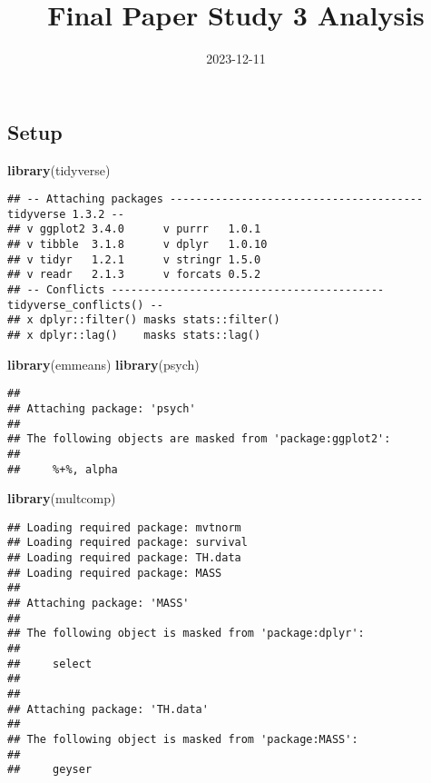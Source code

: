 \documentclass[
]{article}
\title{Final Paper Study 3 Analysis}
\author{}
\date{\vspace{-2.5em}2023-12-11}
\newenvironment{Shaded}{\begin{snugshade}}{\end{snugshade}}
\newcommand{\FunctionTok}[1]{\textcolor[rgb]{0.13,0.29,0.53}{\textbf{#1}}}
\newcommand{\NormalTok}[1]{#1}
\begin{document}
\maketitle

\hypertarget{setup}{%
\subsection{Setup}\label{setup}}

\begin{Shaded}
\begin{Highlighting}[]
\FunctionTok{library}\NormalTok{(tidyverse)}
\end{Highlighting}
\end{Shaded}

\begin{verbatim}
## -- Attaching packages --------------------------------------- tidyverse 1.3.2 --
## v ggplot2 3.4.0      v purrr   1.0.1 
## v tibble  3.1.8      v dplyr   1.0.10
## v tidyr   1.2.1      v stringr 1.5.0 
## v readr   2.1.3      v forcats 0.5.2 
## -- Conflicts ------------------------------------------ tidyverse_conflicts() --
## x dplyr::filter() masks stats::filter()
## x dplyr::lag()    masks stats::lag()
\end{verbatim}

\begin{Shaded}
\begin{Highlighting}[]
\FunctionTok{library}\NormalTok{(emmeans)}
\FunctionTok{library}\NormalTok{(psych)}
\end{Highlighting}
\end{Shaded}

\begin{verbatim}
## 
## Attaching package: 'psych'
## 
## The following objects are masked from 'package:ggplot2':
## 
##     %+%, alpha
\end{verbatim}

\begin{Shaded}
\begin{Highlighting}[]
\FunctionTok{library}\NormalTok{(multcomp)}
\end{Highlighting}
\end{Shaded}

\begin{verbatim}
## Loading required package: mvtnorm
## Loading required package: survival
## Loading required package: TH.data
## Loading required package: MASS
## 
## Attaching package: 'MASS'
## 
## The following object is masked from 'package:dplyr':
## 
##     select
## 
## 
## Attaching package: 'TH.data'
## 
## The following object is masked from 'package:MASS':
## 
##     geyser
\end{verbatim}
\end{document}
